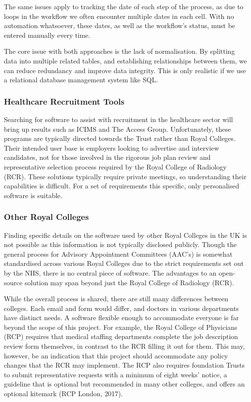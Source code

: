 \begin{multicols}{2}
The same issues apply to tracking the date of each step of the process, as due to loops in the workflow we often encounter multiple dates in each cell. With no automation whatsoever, these dates, as well as the workflow’s status, must be entered manually every time.

The core issue with both approaches is the lack of normalisation. By splitting data into multiple related tables, and establishing relationships between them, we can reduce redundancy and improve data integrity. This is only realistic if we use a relational database management system like SQL.
\subsubsection{Healthcare Recruitment Tools}
Searching for software to assist with recruitment in the healthcare sector will bring up results such as ICIMS and The Access Group. Unfortunately, these programs are typically directed towards the Trust rather than Royal Colleges. Their intended user base is employers looking to advertise and interview candidates, not for those involved in the rigorous job plan review and representative selection process required by the Royal College of Radiology (RCR). These solutions typically require private meetings, so understanding their capabilities is difficult. For a set of requirements this specific, only personalised software is suitable.
\subsubsection{Other Royal Colleges}
Finding specific details on the software used by other Royal Colleges in the UK is not possible as this information is not typically disclosed publicly. Though the general process for Advisory Appointment Committees (AAC’s) is somewhat standardised across various Royal Colleges due to the strict requirements set out by the NHS, there is no central piece of software. The advantages to an open-source solution may span beyond just the Royal College of Radiology (RCR). 

While the overall process is shared, there are still many differences between colleges. Each email and form would differ, and doctors in various departments have distinct needs. A software flexible enough to accommodate everyone is far beyond the scope of this project. For example, the Royal College of Physicians (RCP) requires that medical staffing departments complete the job description review form themselves, in contrast to the RCR filling it out for them. This may, however, be an indication that this project should accommodate any policy changes that the RCR may implement. The RCP also requires foundation Trusts to submit representative requests with a minimum of eight weeks’ notice, a guideline that is optional but recommended in many other colleges, and offers an optional kitemark (RCP London, 2017).


\end{multicols}
